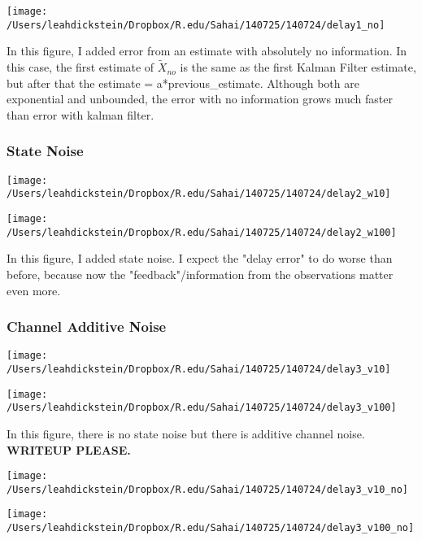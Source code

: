 \documentclass[leqno,twocolumn]{article}
\begin{document}
\begin{minipage}[c]{0.5\textwidth}
\texttt{[image: /Users/leahdickstein/Dropbox/R.edu/Sahai/140725/140724/delay1\_no]}
\end{minipage}
\begin{minipage}[b]{0.5\textwidth}
In this figure, I added error from an estimate with absolutely no information. In this case, the first estimate of $\tilde{X}_{no}$ is the same as the first Kalman Filter estimate, but after that the estimate = a*previous\_estimate. Although both are exponential and unbounded, the error with no information grows much faster than error with kalman filter.
\end{minipage}

\subsubsection{State Noise}

\begin{minipage}[c]{0.5\textwidth}
\texttt{[image: /Users/leahdickstein/Dropbox/R.edu/Sahai/140725/140724/delay2\_w10]}
\end{minipage}
\begin{minipage}[c]{0.5\textwidth}
\texttt{[image: /Users/leahdickstein/Dropbox/R.edu/Sahai/140725/140724/delay2\_w100]}
\end{minipage}

In this figure, I added state noise. I expect the "delay error" to do worse than before, because now the "feedback"/information from the observations matter even more.

\subsubsection{Channel Additive Noise}

\begin{minipage}[c]{0.5\textwidth}
\texttt{[image: /Users/leahdickstein/Dropbox/R.edu/Sahai/140725/140724/delay3\_v10]}
\end{minipage}
\begin{minipage}[c]{0.5\textwidth}
\texttt{[image: /Users/leahdickstein/Dropbox/R.edu/Sahai/140725/140724/delay3\_v100]}
\end{minipage}

In this figure, there is no state noise but there is additive channel noise. \textbf{WRITEUP PLEASE.}

\begin{minipage}[c]{0.5\textwidth}
\texttt{[image: /Users/leahdickstein/Dropbox/R.edu/Sahai/140725/140724/delay3\_v10\_no]}
\end{minipage}
\begin{minipage}[c]{0.5\textwidth}
\texttt{[image: /Users/leahdickstein/Dropbox/R.edu/Sahai/140725/140724/delay3\_v100\_no]}
\end{minipage}
\end{document}
